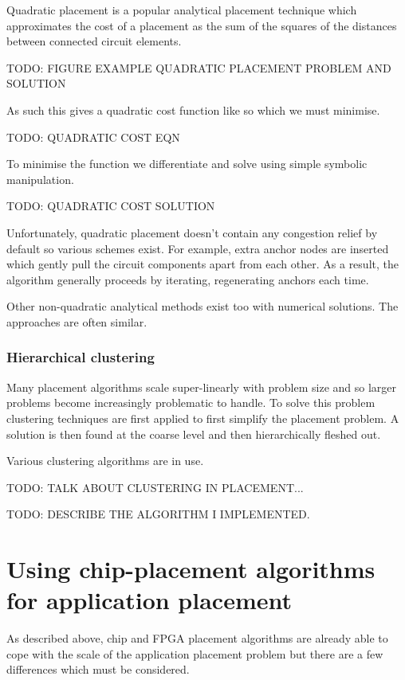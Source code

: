 				Quadratic placement is a popular analytical placement technique which
				approximates the cost of a placement as the sum of the squares of the
				distances between connected circuit elements.
				
				TODO: FIGURE EXAMPLE QUADRATIC PLACEMENT PROBLEM AND SOLUTION
				
				As such this gives a quadratic cost function like so which we must
				minimise.
				
				TODO: QUADRATIC COST EQN
				
				To minimise the function we differentiate and solve using simple
				symbolic manipulation.
				
				TODO: QUADRATIC COST SOLUTION
				
				Unfortunately, quadratic placement doesn't contain any congestion
				relief by default so various schemes exist. For example, extra anchor
				nodes are inserted which gently pull the circuit components apart from
				each other. As a result, the algorithm generally proceeds by iterating,
				regenerating anchors each time.
				
				Other non-quadratic analytical methods exist too with numerical
				solutions. The approaches are often similar.
			
			\subsubsection{Hierarchical clustering}
				
				Many placement algorithms scale super-linearly with problem size and so
				larger problems become increasingly problematic to handle. To solve
				this problem clustering techniques are first applied to first simplify
				the placement problem. A solution is then found at the coarse level and
				then hierarchically fleshed out.
				
				Various clustering algorithms are in use.
				
				TODO: TALK ABOUT CLUSTERING IN PLACEMENT...
				
				TODO: DESCRIBE THE ALGORITHM I IMPLEMENTED.
	
	\section{Using chip-placement algorithms for application placement}
		
		As described above, chip and FPGA placement algorithms are already able to
		cope with the scale of the application placement problem but there are a
		few differences which must be considered.
		
